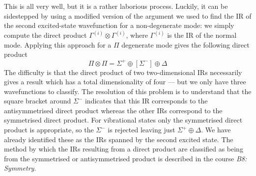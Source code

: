 \documentclass{article}
\theoremstyle{plain}\theoremheaderfont{\normalfont\itshape}\theorembodyfont{\rmfamily}\theoremseparator{.}\newtheorem*{rem}{Remark}\newtheorem*{ex}{Example}\newtheorem*{proof}{Proof}\newtheorem*{altp}{Alternative proof}
\theoremstyle{plain}\theoremheaderfont{\normalfont\bfseries}\theorembodyfont{\rmfamily}\theoremseparator{.}\newtheorem{thm}{Theorem}[section]\newtheorem{lem}[thm]{Lemma}\newtheorem{prop}[thm]{Proposition}\newtheorem*{cor}{Corollary}\newtheorem{defn}[thm]{Definition}\newtheorem{clm}[thm]{Claim}\newtheorem{clminproof}{Claim}\newtheorem{pos}{Postulate}[section]
\theoremstyle{break}\theoremheaderfont{\normalfont\itshape}\theorembodyfont{\rmfamily}\theoremseparator{.\medskip}\newtheorem*{proofskip}{Proof}\newtheorem*{exs}{Examples}\newtheorem*{rems}{Remarks}
\theoremstyle{break}\theoremheaderfont{\normalfont\bfseries}\theorembodyfont{\rmfamily}\theoremseparator{.\medskip}\newtheorem{lemskip}[thm]{Lemma}\newtheorem{defnskip}[thm]{Definition}\newtheorem{propskip}[thm]{Proposition}\newtheorem{thmskip}[thm]{Theorem}
\numberwithin{equation}{section}
\begin{document}
    This is all very well, but it is a rather laborious process. Luckily, it can be sidestepped by using a modified version of the argument we used to find the IR of the second excited-state wavefunction for a non-degenerate mode: we simply compute the direct product \(\Gamma^{(i)}\otimes\Gamma^{(i)}\), where \(\Gamma^{(i)}\) is the IR of the normal mode. Applying this approach for a \(\Pi\) degenerate mode gives the following direct product
    \begin{equation}
        \Pi\otimes\Pi=\Sigma^+\oplus[\Sigma^-]\oplus\Delta
    \end{equation}
    The difficulty is that the direct product of two two-dimensional IRs necessarily gives a result which has a total dimensionality of four --- but we only have three wavefunctions to classify. The resolution of this problem is to understand that the square bracket around \(\Sigma^-\) indicates that this IR corresponds to the antisymmetrised direct product whereas the other IRs correspond to the symmetrised direct product. For vibrational states only the symmetrised direct product is appropriate, so the \(\Sigma^-\) is rejected leaving just \(\Sigma^+\oplus\Delta\). We have already identified these as the IRs spanned by the second excited state. The method by which the IRs resulting from a direct product are classified as being from the symmetrised or antisymmetrised product is described in the course \textit{B8: Symmetry}.
    
\end{document}
